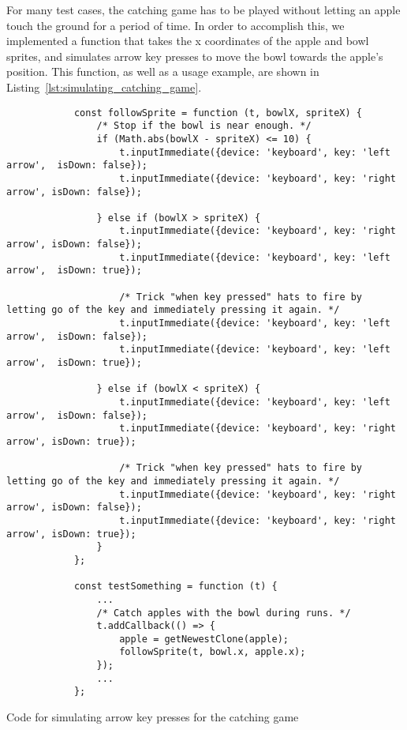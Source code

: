 For many test cases, the catching game has to be played without letting an apple touch the ground for a period of time.
In order to accomplish this, we implemented a function
that takes the x coordinates of the apple and bowl sprites,
and simulates arrow key presses to move the bowl towards the apple's position.
This function, as well as a usage example, are shown in Listing~\ref{lst:simulating_catching_game}.

\begin{listing}[htpb]
    \centering
    \begin{minipage}{.85\textwidth}
        \begin{verbatim}
            const followSprite = function (t, bowlX, spriteX) {
                /* Stop if the bowl is near enough. */
                if (Math.abs(bowlX - spriteX) <= 10) {
                    t.inputImmediate({device: 'keyboard', key: 'left arrow',  isDown: false});
                    t.inputImmediate({device: 'keyboard', key: 'right arrow', isDown: false});

                } else if (bowlX > spriteX) {
                    t.inputImmediate({device: 'keyboard', key: 'right arrow', isDown: false});
                    t.inputImmediate({device: 'keyboard', key: 'left arrow',  isDown: true});

                    /* Trick "when key pressed" hats to fire by letting go of the key and immediately pressing it again. */
                    t.inputImmediate({device: 'keyboard', key: 'left arrow',  isDown: false});
                    t.inputImmediate({device: 'keyboard', key: 'left arrow',  isDown: true});

                } else if (bowlX < spriteX) {
                    t.inputImmediate({device: 'keyboard', key: 'left arrow',  isDown: false});
                    t.inputImmediate({device: 'keyboard', key: 'right arrow', isDown: true});

                    /* Trick "when key pressed" hats to fire by letting go of the key and immediately pressing it again. */
                    t.inputImmediate({device: 'keyboard', key: 'right arrow', isDown: false});
                    t.inputImmediate({device: 'keyboard', key: 'right arrow', isDown: true});
                }
            };

            const testSomething = function (t) {
                ...
                /* Catch apples with the bowl during runs. */
                t.addCallback(() => {
                    apple = getNewestClone(apple);
                    followSprite(t, bowl.x, apple.x);
                });
                ...
            };
        \end{verbatim}
    \end{minipage}

    \caption{Code for simulating arrow key presses for the catching game}
    \label{lst:simulating_catching_game}
\end{listing}

